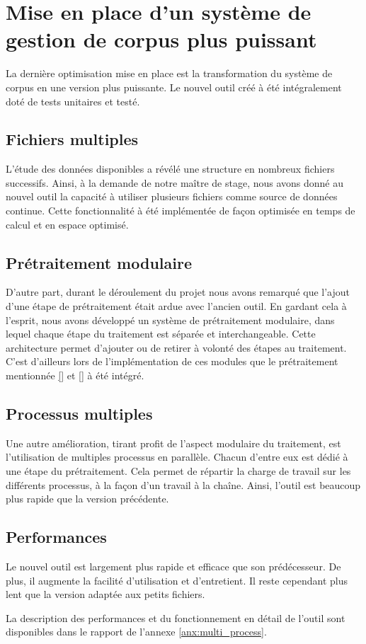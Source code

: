 \section{Mise en place d'un système de gestion de corpus plus puissant}\label{sec:papud_mulitiqueue}
La dernière optimisation mise en place est la transformation du système de corpus en une version plus puissante. Le nouvel outil créé à été intégralement doté de tests unitaires et testé.

\subsection{Fichiers multiples}
L'étude des données disponibles a révélé une structure en nombreux fichiers successifs.
Ainsi, à la demande de notre maître de stage, nous avons donné au nouvel outil la capacité à utiliser plusieurs fichiers comme source de données continue.
Cette fonctionnalité à été implémentée de façon optimisée en temps de calcul et en espace optimisé.

\subsection{Prétraitement modulaire}
D'autre part, durant le déroulement du projet nous avons remarqué que l'ajout d'une étape de prétraitement était ardue avec l'ancien outil.
En gardant cela à l'esprit, nous avons développé un système de prétraitement modulaire, dans lequel chaque étape du traitement est séparée et interchangeable.
Cette architecture permet d'ajouter ou de retirer à volonté des étapes au traitement.
C'est d'ailleurs lors de l'implémentation de ces modules que le prétraitement mentionnée \autoref{} et \autoref{} à été intégré.

\subsection{Processus multiples}
Une autre amélioration, tirant profit de l'aspect modulaire du traitement, est l'utilisation de multiples processus en parallèle.
Chacun d'entre eux est dédié à une étape du prétraitement.
Cela permet de répartir la charge de travail sur les différents processus, à la façon d'un travail à la chaîne.
Ainsi, l'outil est beaucoup plus rapide que la version précédente.

\subsection{Performances}
Le nouvel outil est largement plus rapide et efficace que son prédécesseur.
De plus, il augmente la facilité d'utilisation et d'entretient.
Il reste cependant plus lent que la version adaptée aux petits fichiers.

La description des performances et du fonctionnement en détail de l'outil sont disponibles dans le rapport de l'annexe \ref{anx:multi_process}.
